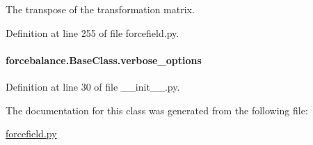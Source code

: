 The transpose of the transformation matrix. 



Definition at line 255 of file forcefield.\-py.

\hypertarget{classforcebalance_1_1BaseClass_afd68efa29ccd2f320f4cf82198214aac}{
\paragraph[{verbose\-\_\-options}]{\setlength{\rightskip}{0pt plus 5cm}forcebalance.\-Base\-Class.\-verbose\-\_\-options\hspace{0.3cm}{\ttfamily [inherited]}}}\label{classforcebalance_1_1BaseClass_afd68efa29ccd2f320f4cf82198214aac}


Definition at line 30 of file \-\_\-\-\_\-init\-\_\-\-\_\-.\-py.



The documentation for this class was generated from the following file\-:\begin{DoxyCompactItemize}
\item 
\hyperlink{forcefield_8py}{forcefield.\-py}\end{DoxyCompactItemize}
